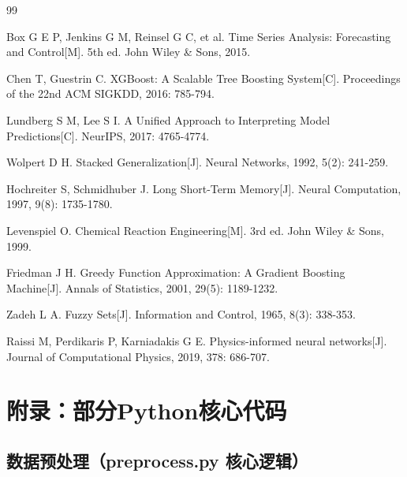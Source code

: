 \documentclass[12pt,a4paper]{ctexart}
\begin{document}
\newpage
\begin{thebibliography}{99}

 Box G E P, Jenkins G M, Reinsel G C, et al. Time Series Analysis: Forecasting and Control[M]. 5th ed. John Wiley \& Sons, 2015.

 Chen T, Guestrin C. XGBoost: A Scalable Tree Boosting System[C]. Proceedings of the 22nd ACM SIGKDD, 2016: 785-794.

 Lundberg S M, Lee S I. A Unified Approach to Interpreting Model Predictions[C]. NeurIPS, 2017: 4765-4774.

 Wolpert D H. Stacked Generalization[J]. Neural Networks, 1992, 5(2): 241-259.

 Hochreiter S, Schmidhuber J. Long Short-Term Memory[J]. Neural Computation, 1997, 9(8): 1735-1780.

 Levenspiel O. Chemical Reaction Engineering[M]. 3rd ed. John Wiley \& Sons, 1999.

 Friedman J H. Greedy Function Approximation: A Gradient Boosting Machine[J]. Annals of Statistics, 2001, 29(5): 1189-1232.

 Zadeh L A. Fuzzy Sets[J]. Information and Control, 1965, 8(3): 338-353.

 Raissi M, Perdikaris P, Karniadakis G E. Physics-informed neural networks[J]. Journal of Computational Physics, 2019, 378: 686-707.

\end{thebibliography}

\newpage
\section*{附录：部分Python核心代码}

\subsection*{数据预处理（preprocess.py 核心逻辑）}
\end{document}
